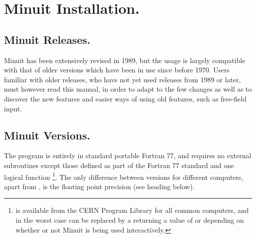  
\chapter{Minuit Installation.}

\section{Minuit Releases.}
 
Minuit has been extensively revised in 1989, but the usage is
largely compatible
with that of older versions which have been in use since before 1970.
Users familiar with older releases, who have not yet used releases
from 1989 or later, must however read this manual, in order to
adapt to the few changes as well as to discover the new features
and easier ways of using old features, such as free-field input.

\section{Minuit Versions.}

The program is entirely in standard portable Fortran 77,
and requires no external subroutines except those defined as part of
the Fortran 77 standard and one logical function 
\footnote{ is available from the CERN Program Library 
for all common
computers, and in the worst case can be replaced by a 
returning a value of  or  depending on
whether or not Minuit is being used interactively.}.
The only difference between versions for different computers,
apart from , is the floating point precision (see heading below).
 
